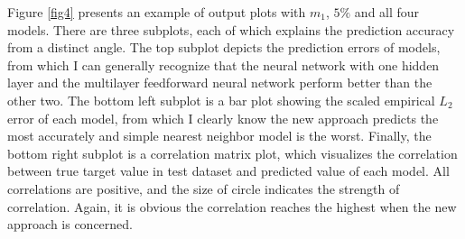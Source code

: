 Figure \ref{fig4} presents an example of output plots with $m_1$, $5\%$ and all four models. There are three subplots, each of which explains the prediction accuracy from a distinct angle. The top subplot depicts the prediction errors of models, from which I can generally recognize that the neural network with one hidden layer and the multilayer feedforward neural network perform better than the other two. The bottom left subplot is a bar plot showing the scaled empirical $L_2$ error of each model, from which I clearly know the new approach predicts the most accurately and simple nearest neighbor model is the worst. Finally, the bottom right subplot is a correlation matrix plot, which visualizes the correlation between true target value in test dataset and predicted value of each model. All correlations are positive, and the size of circle indicates the strength of correlation. Again, it is obvious the correlation reaches the highest when the new approach is concerned.

